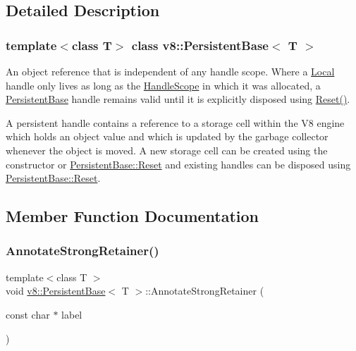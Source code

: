 \subsection{Detailed Description}
\subsubsection*{template$<$class T$>$\newline
class v8\+::\+Persistent\+Base$<$ T $>$}

An object reference that is independent of any handle scope. Where a \mbox{\hyperlink{classv8_1_1Local}{Local}} handle only lives as long as the \mbox{\hyperlink{classv8_1_1HandleScope}{Handle\+Scope}} in which it was allocated, a \mbox{\hyperlink{classv8_1_1PersistentBase}{Persistent\+Base}} handle remains valid until it is explicitly disposed using \mbox{\hyperlink{classv8_1_1PersistentBase_a174bb1e45b18fd4eeaee033622825bb8}{Reset()}}.

A persistent handle contains a reference to a storage cell within the V8 engine which holds an object value and which is updated by the garbage collector whenever the object is moved. A new storage cell can be created using the constructor or \mbox{\hyperlink{classv8_1_1PersistentBase_a174bb1e45b18fd4eeaee033622825bb8}{Persistent\+Base\+::\+Reset}} and existing handles can be disposed using \mbox{\hyperlink{classv8_1_1PersistentBase_a174bb1e45b18fd4eeaee033622825bb8}{Persistent\+Base\+::\+Reset}}. 

\subsection{Member Function Documentation}
\mbox{\label{classv8_1_1PersistentBase_a27ddb6118b13225207e9641c1e6c8c91}} 
\subsubsection{\texorpdfstring{Annotate\+Strong\+Retainer()}{AnnotateStrongRetainer()}}
{\footnotesize\ttfamily template$<$class T $>$ \\
void \mbox{\hyperlink{classv8_1_1PersistentBase}{v8\+::\+Persistent\+Base}}$<$ T $>$\+::Annotate\+Strong\+Retainer (\begin{DoxyParamCaption}\item[{const char $\ast$}]{label }\end{DoxyParamCaption})}

